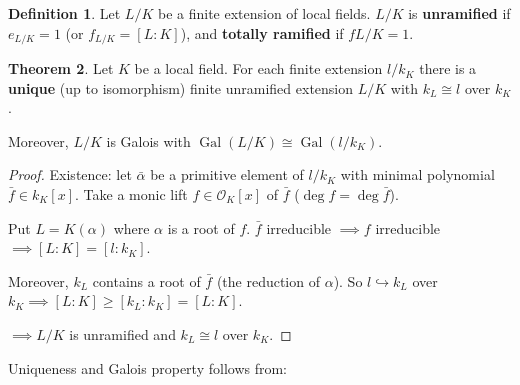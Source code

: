 \documentclass[a4paper]{article}
\theoremstyle{definition}
\newtheorem{definition}{Definition}
\theoremstyle{default}
\newtheorem{theorem}[definition]{Theorem}
\theoremstyle{remark}
\DeclareMathOperator{\Gal}{Gal}
\begin{document}
\begin{definition}
	Let $L/K$ be a finite extension of local fields.
	$L/K$ is \textbf{unramified} if $e_{L/K} = 1$ (or $f_{L/K} = [L:K]$),
	and \textbf{totally ramified} if $f{L/K} =1$.
\end{definition}

\begin{theorem}
	Let $K$ be a local field.
	For each finite extension $l/k_K$ there is a \textbf{unique} (up to isomorphism) finite unramified extension $L/K$ with $k_L \cong l$ over $k_K$.
	
	Moreover, $L/K$ is Galois with $\Gal(L/K) \cong \Gal(l/k_K)$.
	\label{73}
\end{theorem}
\begin{proof}
	Existence: let $\bar{\alpha}$ be a primitive element of $l/k_K$ with minimal polynomial $\bar{f} \in k_K[x]$.
	Take a monic lift $f \in \mathcal{O}_K[x]$ of $\bar{f}$ ($\deg f = \deg \bar{f}$).
	
	Put $L=K(\alpha)$ where $\alpha$ is a root of $f$.
	$\bar{f}$ irreducible $\implies f$ irreducible $\implies [L:K] = [l:k_K]$.
	
	Moreover, $k_L$ contains a root of $\bar{f}$ (the reduction of $\alpha$).
	So $l \hookrightarrow k_L$ over $k_K \implies [L:K] \geq [k_L:k_K] = [L:K]$.
	
	$\implies L/K$ is unramified and $k_L \cong l$ over $k_K$.
\end{proof}

Uniqueness and Galois property follows from:
\end{document}
